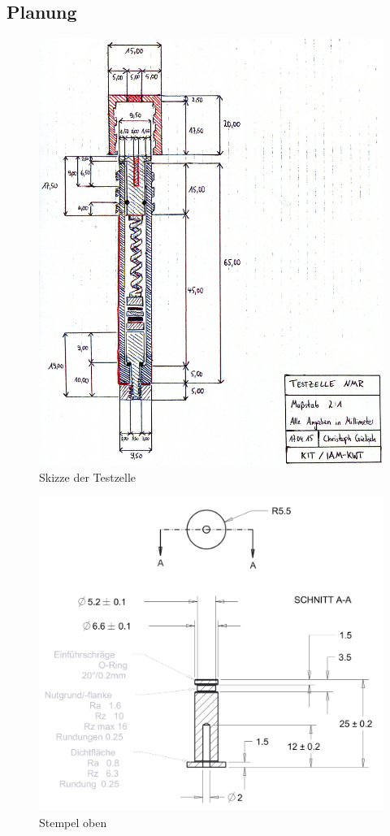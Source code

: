 \documentclass[a4paper, 11pt, headsepline,footsepline,twoside,abstract]{scrbook}
\begin{document}
\subsection{Planung}
\begin{figure}
	\centering
	\includegraphics[width=1.0\columnwidth]{images/Skizze_Testzelle.jpg}
	\caption{Skizze der Testzelle}
	\label{skizze_testzelle}
\end{figure}
\begin{figure}
	\centering
	\includegraphics[width=0.7\columnwidth]{images/stempel_oben.png}
	\caption{Stempel oben}
	\label{stempel_oben}
\end{figure}
\end{document}
